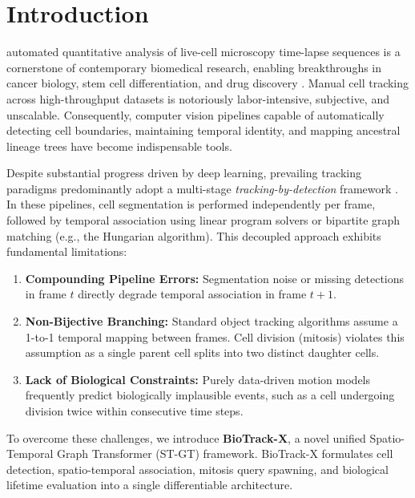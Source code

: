 \documentclass[10pt,journal,compsoc]{IEEEtran}
\begin{document}
\maketitle
\IEEEdisplaynontitleabstractindextext
\IEEEpeerreviewmaketitle

\section{Introduction}
 automated quantitative analysis of live-cell microscopy time-lapse sequences is a cornerstone of contemporary biomedical research, enabling breakthroughs in cancer biology, stem cell differentiation, and drug discovery \cite{trackastra}. Manual cell tracking across high-throughput datasets is notoriously labor-intensive, subjective, and unscalable. Consequently, computer vision pipelines capable of automatically detecting cell boundaries, maintaining temporal identity, and mapping ancestral lineage trees have become indispensable tools.

Despite substantial progress driven by deep learning, prevailing tracking paradigms predominantly adopt a multi-stage \textit{tracking-by-detection} framework \cite{ultrack}. In these pipelines, cell segmentation is performed independently per frame, followed by temporal association using linear program solvers or bipartite graph matching (e.g., the Hungarian algorithm). This decoupled approach exhibits fundamental limitations:
\begin{enumerate}
    \item \textbf{Compounding Pipeline Errors:} Segmentation noise or missing detections in frame $t$ directly degrade temporal association in frame $t+1$.
    \item \textbf{Non-Bijective Branching:} Standard object tracking algorithms assume a 1-to-1 temporal mapping between frames. Cell division (mitosis) violates this assumption as a single parent cell splits into two distinct daughter cells.
    \item \textbf{Lack of Biological Constraints:} Purely data-driven motion models frequently predict biologically implausible events, such as a cell undergoing division twice within consecutive time steps.
\end{enumerate}

To overcome these challenges, we introduce \textbf{BioTrack-X}, a novel unified Spatio-Temporal Graph Transformer (ST-GT) framework. BioTrack-X formulates cell detection, spatio-temporal association, mitosis query spawning, and biological lifetime evaluation into a single differentiable architecture.
\end{document}

